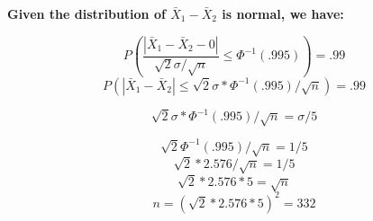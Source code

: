 \documentclass[11pt,letterpaper]{article}
\numberwithin{equation}{section}
\begin{document}
\begin{enumerate}[I]
\begin{enumerate}[1)]
\begin{enumerate}[a)]
 \textbf{Given the distribution of $\bar{X}_1-\bar{X}_2$ is normal, we have:}
  
$$P(\frac{| \bar{X}_1-\bar{X}_2-0|}{\sqrt{2}\sigma/\sqrt{n}}\leq \Phi^{-1}(.995))=.99$$
$$P(| \bar{X}_1-\bar{X}_2|\leq \sqrt{2}\sigma*\Phi^{-1}(.995)/\sqrt{n})=.99$$

$$\sqrt{2}\sigma*\Phi^{-1}(.995)/\sqrt{n} = \sigma/5$$

$$\sqrt{2}\Phi^{-1}(.995)/\sqrt{n} =1/5$$
$$\sqrt{2}*2.576/\sqrt{n}=1/5$$
$$\sqrt{2}*2.576*5=\sqrt{n}$$
$$n=(\sqrt{2}*2.576*5)^2=332$$
\end{enumerate}


\end{enumerate}


\end{enumerate}
\end{document}
